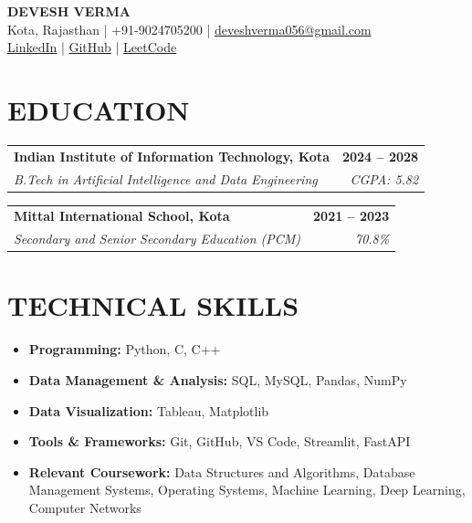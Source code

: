 \documentclass[10pt,a4paper]{article}
\makeatletter
\newcommand{\resumeSubheading}[4]{
    \begin{tabularx}{\textwidth}{@{}X r@{}}
        \textbf{#1} & \textbf{#2} \\
        \textit{#3} & \textit{#4}
    \end{tabularx}
}
\makeatother
\begin{document}

\begin{center}
    {\Huge\bfseries\color{heading} DEVESH VERMA}\\[4pt]
    

    Kota, Rajasthan
    \quad | \quad +91-9024705200
    \quad | \quad
    \href{mailto:deveshverma056@gmail.com}{deveshverma056@gmail.com}
    \\[3pt]

    \href{https://www.linkedin.com/in/deveshverma-iiitkota/}{LinkedIn}
    \quad | \quad
    \href{https://github.com/account}{GitHub}
    \quad | \quad
    \href{https://leetcode.com/u/Deveshchampion/}{LeetCode}
\end{center}


\section*{EDUCATION}

\resumeSubheading
{Indian Institute of Information Technology, Kota}
{2024 -- 2028}
{B.Tech in Artificial Intelligence and Data Engineering}
{CGPA: 5.82}

\vspace{4pt}

\resumeSubheading
{Mittal International School, Kota}
{2021 -- 2023}
{Secondary and Senior Secondary Education (PCM)}
{70.8\%}


\section*{TECHNICAL SKILLS}

\begin{itemize}
    \item \textbf{Programming:} Python, C, C++
    \item \textbf{Data Management \& Analysis:} SQL, MySQL, Pandas, NumPy
    \item \textbf{Data Visualization:} Tableau, Matplotlib
    \item \textbf{Tools \& Frameworks:} Git, GitHub, VS Code, Streamlit, FastAPI
    \item \textbf{Relevant Coursework:} Data Structures and Algorithms, Database Management Systems, Operating Systems, Machine Learning, Deep Learning, Computer Networks
\end{itemize}
\end{document}
